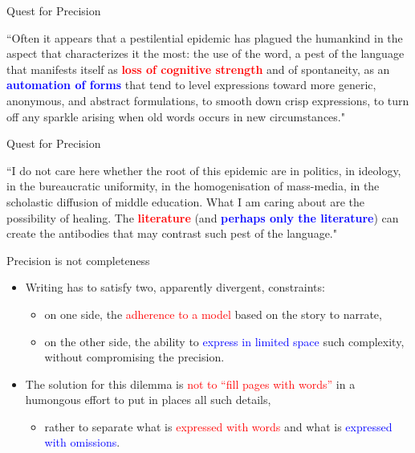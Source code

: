 \documentclass{beamer}
\begin{document}
\begin{frame}
{\centerline{Quest for Precision}}
\begin{tcolorbox}[fonttitle=\bfseries,nobeforeafter,center title,colback=yellow!5,colframe=yellow!40!black,title=The Plague (for Calvino)]
    ``Often it appears that a pestilential epidemic has plagued the humankind in the aspect that characterizes it the most: the use of the word, a pest of the language that manifests itself as \textcolor{red}{\textbf{loss of cognitive strength}} and of spontaneity, as an \textcolor{blue}{\textbf{automation of forms}} that tend to level expressions toward more generic, anonymous, and abstract formulations, to smooth down crisp expressions, to turn off any sparkle arising when old words occurs in new circumstances."
\end{tcolorbox}

\end{frame}

\begin{frame}
{\centerline{Quest for Precision}}
\begin{tcolorbox}[fonttitle=\bfseries,nobeforeafter,center title,colback=yellow!5,colframe=yellow!40!black,title=The Plague (for Calvino)]
    ``I do not care here whether the root of this epidemic are in politics, in ideology, in the bureaucratic uniformity, in the homogenisation of mass-media, in the scholastic diffusion of middle education. What I am caring about are the possibility of healing. The \textcolor{red}{\textbf{literature}} (and \textcolor{blue}{\textbf{perhaps only the literature}}) can create the antibodies that may contrast such pest of the language."
\end{tcolorbox}

\end{frame}

\begin{frame}
{\centerline{Precision is not completeness}}
\begin{itemize}
\item Writing has to satisfy two, apparently divergent, constraints:
\begin{itemize}
\item on one side, the \textcolor{red}{adherence to a model} based on the story to narrate,
\item on the other side, the ability to \textcolor{blue}{express in limited space} such complexity, without compromising the precision.
\end{itemize} \vspace{0.2cm}
\item The solution for this dilemma is \textcolor{red}{not to ``fill pages with words''} in a humongous effort to put in places all such details, \begin{itemize}
\item rather to separate what is \textcolor{red}{expressed with words} and what is \textcolor{blue}{expressed with omissions}.
\end{itemize}
\end{itemize}

\end{frame}
\end{document}
